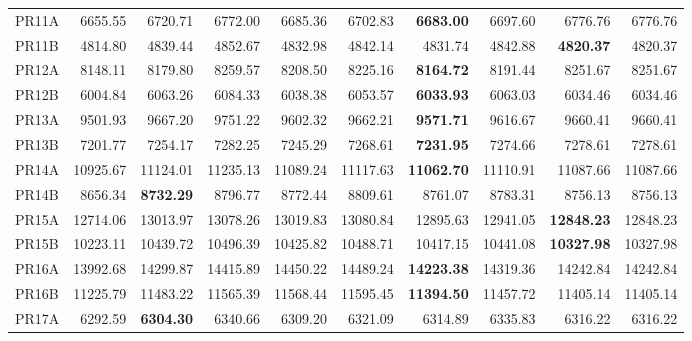 \documentclass{setp-new}
\newcommand{\setptabsetup}{\small\renewcommand{\arraystretch}{0.95}\setlength{\tabcolsep}{2.2pt}\hbadness=10000}
\begin{document}
\begingroup
\setptabsetup
{}\label{tab:benchmark-results}
\tabletail{}
\tablelasttail{\bottomrule}
\begin{supertabular*}{\textwidth}{@{\extracolsep{\fill}}lrrrrrrrrr@{}}
    PR11A & 6655.55 & 6720.71 & 6772.00 & 6685.36 & 6702.83 & \textbf{6683.00} & 6697.60 & 6776.76 & 6776.76\\
    PR11B & 4814.80 & 4839.44 & 4852.67 & 4832.98 & 4842.14 & 4831.74 & 4842.88 & \textbf{4820.37} & 4820.37\\
    PR12A & 8148.11 & 8179.80 & 8259.57 & 8208.50 & 8225.16 & \textbf{8164.72} & 8191.44 & 8251.67 & 8251.67\\
    PR12B & 6004.84 & 6063.26 & 6084.33 & 6038.38 & 6053.57 & \textbf{6033.93} & 6063.03 & 6034.46 & 6034.46\\
    PR13A & 9501.93 & 9667.20 & 9751.22 & 9602.32 & 9662.21 & \textbf{9571.71} & 9616.67 & 9660.41 & 9660.41\\
    PR13B & 7201.77 & 7254.17 & 7282.25 & 7245.29 & 7268.61 & \textbf{7231.95} & 7274.66 & 7278.61 & 7278.61\\
    PR14A & 10925.67 & 11124.01 & 11235.13 & 11089.24 & 11117.63 & \textbf{11062.70} & 11110.91 & 11087.66 & 11087.66\\
    PR14B & 8656.34 & \textbf{8732.29} & 8796.77 & 8772.44 & 8809.61 & 8761.07 & 8783.31 & 8756.13 & 8756.13\\
    PR15A & 12714.06 & 13013.97 & 13078.26 & 13019.83 & 13080.84 & 12895.63 & 12941.05 & \textbf{12848.23} & 12848.23\\
    PR15B & 10223.11 & 10439.72 & 10496.39 & 10425.82 & 10488.71 & 10417.15 & 10441.08 & \textbf{10327.98} & 10327.98\\
    PR16A & 13992.68 & 14299.87 & 14415.89 & 14450.22 & 14489.24 & \textbf{14223.38} & 14319.36 & 14242.84 & 14242.84\\
    PR16B & 11225.79 & 11483.22 & 11565.39 & 11568.44 & 11595.45 & \textbf{11394.50} & 11457.72 & 11405.14 & 11405.14\\
    PR17A & 6292.59 & \textbf{6304.30} & 6340.66 & 6309.20 & 6321.09 & 6314.89 & 6335.83 & 6316.22 & 6316.22\\

\end{supertabular*}
\end{document}
